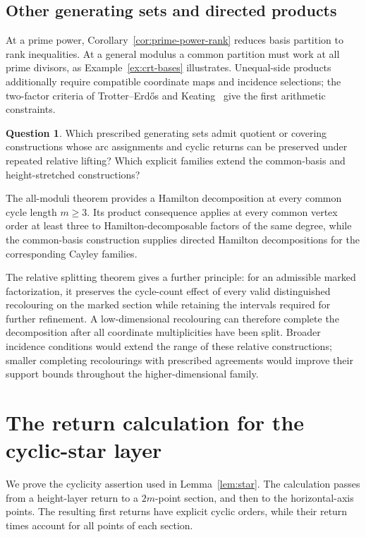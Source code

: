 \documentclass[11pt,reqno]{amsart}
\numberwithin{equation}{section}
\theoremstyle{definition}
\newtheorem{question}[theorem]{Question}
\theoremstyle{remark}
\begin{document}
\subsection{Other generating sets and directed products}
At a prime power, Corollary~\ref{cor:prime-power-rank} reduces basis
partition to rank inequalities. At a general modulus a common partition
must work at all prime divisors, as Example~\ref{ex:crt-bases} illustrates.
Unequal-side products additionally require compatible coordinate maps
and incidence selections; the two-factor criteria of
Trotter--Erd\H{o}s and Keating~\cite{TE78,Keating85} give the first
arithmetic constraints.

\begin{question}\label{ques:other-products}
Which prescribed generating sets admit quotient or covering
constructions whose arc assignments and cyclic returns can be preserved
under repeated relative lifting? Which explicit families extend the
common-basis and height-stretched constructions?
\end{question}

The all-moduli theorem provides a Hamilton decomposition at every
common cycle length $m\ge3$. Its product consequence applies at every
common vertex order at least three to Hamilton-decomposable factors of
the same degree, while the common-basis construction supplies directed
Hamilton decompositions for the corresponding Cayley families.

The relative splitting theorem gives a further principle: for an
admissible marked factorization, it preserves the cycle-count effect
of every valid distinguished recolouring on the marked section while
retaining the intervals required for further refinement. A low-dimensional
recolouring can therefore complete the decomposition after all coordinate
multiplicities have been split. Broader incidence conditions would
extend the range of these relative constructions; smaller completing
recolourings with prescribed agreements would improve their support
bounds throughout the higher-dimensional family.

\appendix
\section{The return calculation for the cyclic-star layer}\label{app:star}
We prove the cyclicity assertion used in Lemma~\ref{lem:star}.
The calculation passes from a height-layer return to a $2m$-point section, and
then to the horizontal-axis points. The resulting first returns have explicit
cyclic orders, while their return times account for all points of each section.
\end{document}
